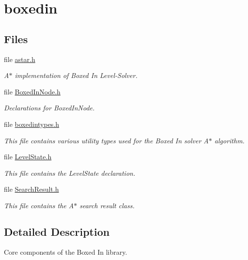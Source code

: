 \hypertarget{group__boxedin__group}{\section{boxedin}
\label{group__boxedin__group}
}
\subsection*{Files}
\begin{DoxyCompactItemize}
\item 
file \hyperlink{astar_8h}{astar.\+h}
\begin{DoxyCompactList}\small\item\em A$\ast$ implementation of Boxed In Level-\/\+Solver. \end{DoxyCompactList}\item 
file \hyperlink{BoxedInNode_8h}{Boxed\+In\+Node.\+h}
\begin{DoxyCompactList}\small\item\em Declarations for Boxed\+In\+Node. \end{DoxyCompactList}\item 
file \hyperlink{boxedintypes_8h}{boxedintypes.\+h}
\begin{DoxyCompactList}\small\item\em This file contains various utility types used for the Boxed In solver A$\ast$ algorithm. \end{DoxyCompactList}\item 
file \hyperlink{LevelState_8h}{Level\+State.\+h}
\begin{DoxyCompactList}\small\item\em This file contains the Level\+State declaration. \end{DoxyCompactList}\item 
file \hyperlink{SearchResult_8h}{Search\+Result.\+h}
\begin{DoxyCompactList}\small\item\em This file contains the A$\ast$ search result class. \end{DoxyCompactList}\end{DoxyCompactItemize}


\subsection{Detailed Description}
Core components of the Boxed In library. 